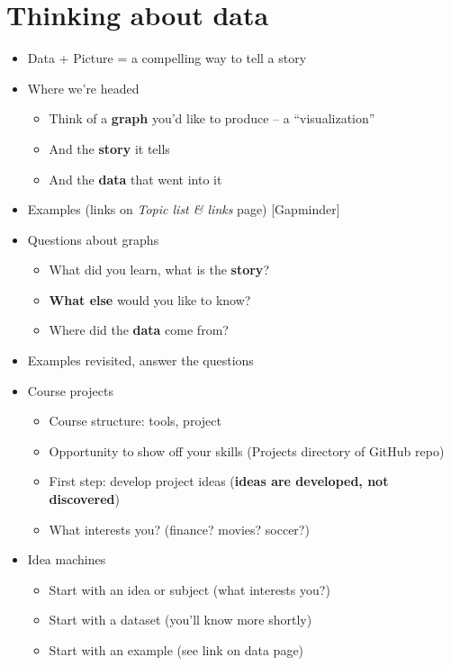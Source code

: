\documentclass[11pt]{article}
\begin{document}
\section*{Thinking about data}

\begin{itemize}

\item Data + Picture = a compelling way to tell a story

\item Where we're headed
\begin{itemize}
\item Think of a {\bf graph\/} you'd like to produce -- a ``visualization''
\item And the {\bf story\/} it tells
\item And the {\bf data\/} that went into it
\end{itemize}

\item Examples (links on {\it Topic list \& links\/} page) [Gapminder]

\item Questions about graphs
\begin{itemize}
\item What did you learn, what is the {\bf story\/}?
\item {\bf What else} would you like to know?
\item Where did the {\bf data\/} come from?
\end{itemize}

\item Examples revisited, answer the questions

\item Course projects
\begin{itemize}
\item Course structure:  tools, project
\item Opportunity to show off your skills (Projects directory of GitHub repo)
\item First step:  develop project ideas ({\bf ideas are developed, not discovered})
\item What interests {you}? (finance? movies?  soccer?)
\end{itemize}

\item Idea machines
\begin{itemize}
\item Start with an idea or subject (what interests you?)
\item Start with a dataset (you'll know more shortly)
\item Start with an example (see link on data page)
\end{itemize}


\end{itemize}
\end{document}
